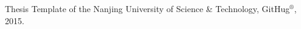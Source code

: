 
\begin{publications}{99}

\item Thesis Template of the Nanjing University of Science \& Technology, GitHug$^{\circledR}$, 2015.

\end{publications}
